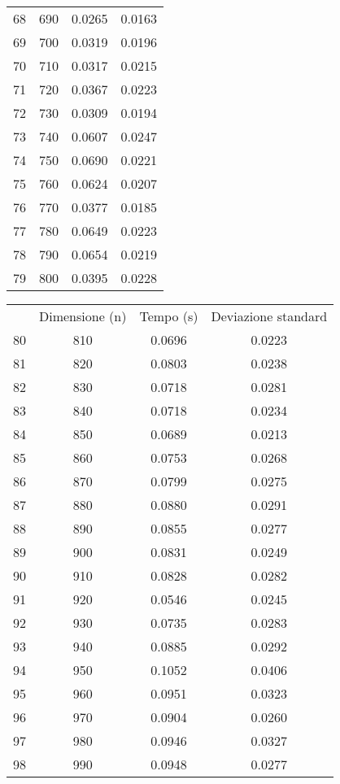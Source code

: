 \begin{table}
\begin{adjustbox}{width=1\textwidth/2}
\begin{tabular}{|c|c|c|c|}
68 & 690 & 0.0265 & 0.0163 \\
\cline{1-4}
69 & 700 & 0.0319 & 0.0196 \\
\cline{1-4}
70 & 710 & 0.0317 & 0.0215 \\
\cline{1-4}
71 & 720 & 0.0367 & 0.0223 \\
\cline{1-4}
72 & 730 & 0.0309 & 0.0194 \\
\cline{1-4}
73 & 740 & 0.0607 & 0.0247 \\
\cline{1-4}
74 & 750 & 0.0690 & 0.0221 \\
\cline{1-4}
75 & 760 & 0.0624 & 0.0207 \\
\cline{1-4}
76 & 770 & 0.0377 & 0.0185 \\
\cline{1-4}
77 & 780 & 0.0649 & 0.0223 \\
\cline{1-4}
78 & 790 & 0.0654 & 0.0219 \\
\cline{1-4}
79 & 800 & 0.0395 & 0.0228 \\
\cline{1-4}
\end{tabular}
\end{adjustbox}
\end{table}

\begin{table}
\centering
\begin{adjustbox}{width=1\textwidth/2}
\begin{tabular}{|c|c|c|c|}
\hline
 & Dimensione (n) & Tempo (s) & Deviazione standard \\
80 & 810 & 0.0696 & 0.0223 \\
\cline{1-4}
81 & 820 & 0.0803 & 0.0238 \\
\cline{1-4}
82 & 830 & 0.0718 & 0.0281 \\
\cline{1-4}
83 & 840 & 0.0718 & 0.0234 \\
\cline{1-4}
84 & 850 & 0.0689 & 0.0213 \\
\cline{1-4}
85 & 860 & 0.0753 & 0.0268 \\
\cline{1-4}
86 & 870 & 0.0799 & 0.0275 \\
\cline{1-4}
87 & 880 & 0.0880 & 0.0291 \\
\cline{1-4}
88 & 890 & 0.0855 & 0.0277 \\
\cline{1-4}
89 & 900 & 0.0831 & 0.0249 \\
\cline{1-4}
90 & 910 & 0.0828 & 0.0282 \\
\cline{1-4}
91 & 920 & 0.0546 & 0.0245 \\
\cline{1-4}
92 & 930 & 0.0735 & 0.0283 \\
\cline{1-4}
93 & 940 & 0.0885 & 0.0292 \\
\cline{1-4}
94 & 950 & 0.1052 & 0.0406 \\
\cline{1-4}
95 & 960 & 0.0951 & 0.0323 \\
\cline{1-4}
96 & 970 & 0.0904 & 0.0260 \\
\cline{1-4}
97 & 980 & 0.0946 & 0.0327 \\
\cline{1-4}
98 & 990 & 0.0948 & 0.0277 \\
\cline{1-4}
\end{tabular}
\end{adjustbox}
\end{table}
